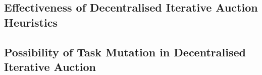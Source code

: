 \subsection{Effectiveness of Decentralised Iterative Auction Heuristics}\label{subsec:effectiveness-of-decentralised-iterative-auction-heuristics}

\subsection{Possibility of Task Mutation in Decentralised Iterative Auction}\label{subsec:possibility-of-task-mutation-in-decentralised-iterative-auction}

